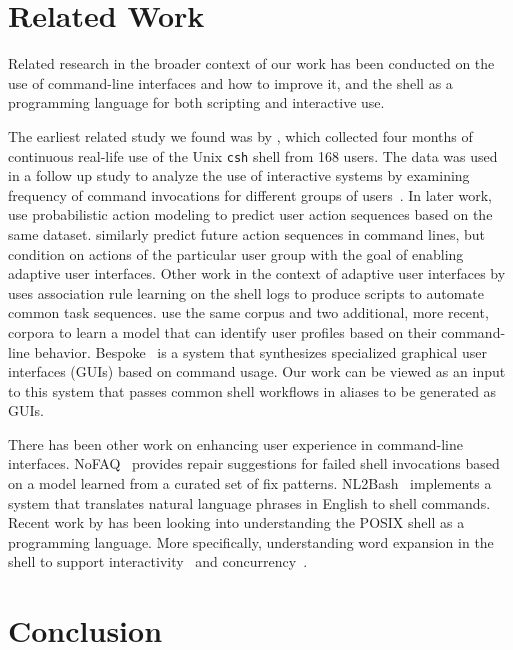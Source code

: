 \documentclass[smallextended,natbib]{svjour3}
\begin{document}
\section{Related Work}

Related research in the broader context of our work has been conducted on the use of command-line interfaces and how to improve it, and the shell as a programming language for both scripting and interactive use. 

The earliest related study we found was by \cite{greenberg:88a}, which collected four months of continuous real-life use of the Unix \verb|csh| shell from 168 users. 
The data was used in a follow up study to analyze the use of interactive systems by examining frequency of command invocations for different groups of users~\citep{greenberg:88b}.
In later work, \cite{davison:98} use probabilistic action modeling to predict user action sequences based on the same dataset.
\cite{korvemaker:00} similarly predict future action sequences in command lines, but condition on actions of the particular user group with the goal of enabling adaptive user interfaces.
Other work in the context of adaptive user interfaces by \cite{jacobs:01} uses association rule learning on the shell logs to produce scripts to automate common task sequences.
\cite{khosmood:14} use the same corpus and two additional, more recent, corpora to learn a model that can identify user profiles based on their command-line behavior.
Bespoke~\citep{bespoke:19} is a system that synthesizes specialized graphical user interfaces (GUIs) based on command usage.
Our work can be viewed as an input to this system that passes common shell workflows in aliases to be generated as GUIs.

There has been other work on enhancing user experience in command-line interfaces.
NoFAQ~\citep{dantoni:17} provides repair suggestions for failed shell invocations based on a model learned from a curated set of fix patterns.
NL2Bash~\citep{lin:18} implements a system that translates natural language phrases in English to shell commands.
Recent work by \cite{greenberg:17} has been looking into understanding the POSIX shell as a programming language.
More specifically, understanding word expansion in the shell to support interactivity~\citep{greenberg:18a} and concurrency~\citep{greenberg:18b}.

\section{Conclusion}
\end{document}

